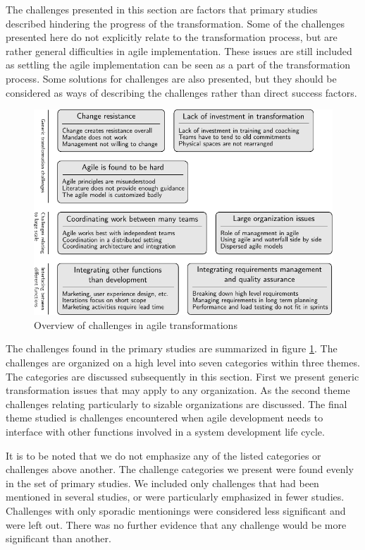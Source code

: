 The challenges presented in this section are factors that primary studies
described hindering the progress of the transformation. Some of the challenges
presented here do not explicitly relate to the transformation process, but are
rather general difficulties in agile implementation. These issues are still
included as settling the agile implementation can be seen as a part of the
transformation process. Some solutions for challenges are also presented, but
they should be considered as ways of describing the challenges rather than
direct success factors.

\begin{figure}[!b]
  \begin{center}
    \includegraphics{graphics/challenges_summary.pdf}
    \caption{Overview of challenges in agile transformations}
    \label{fig:challenges_summary}
  \end{center}
\end{figure}

The challenges found in the primary studies are summarized in figure
\ref{fig:challenges_summary}. The challenges are organized on a high level into
seven categories within three themes. The categories are discussed subsequently
in this section. First we present generic transformation issues that may apply
to any organization. As the second theme challenges relating particularly to
sizable organizations are discussed. The final theme studied is challenges
encountered when agile development needs to interface with other functions
involved in a system development life cycle.

It is to be noted that we do not emphasize any of the listed categories or
challenges above another. The challenge categories we present were found evenly
in the set of primary studies. We included only challenges that had been
mentioned in several studies, or were particularly emphasized in fewer studies.
Challenges with only sporadic mentionings were considered less significant and
were left out. There was no further evidence that any challenge would be more
significant than another.


